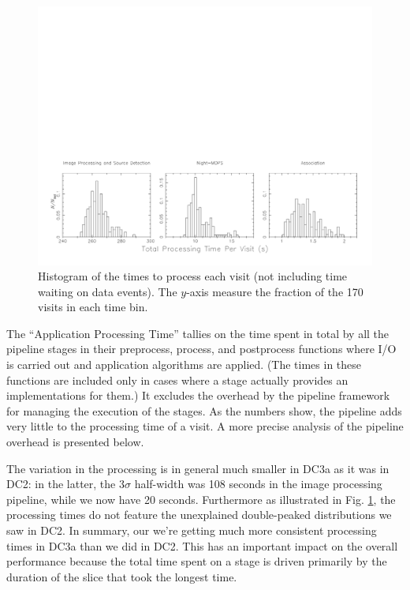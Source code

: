 \begin{figure}[hb]
\begin{center}
\includegraphics[width=\textwidth,bb=0 0 800 276,viewport=25 25 775 250,clip]{images/visitdist.pdf}
\caption{Histogram of the times to process each visit (not including
  time waiting on data events).  The $y$-axis measure the fraction of
  the 170 visits in each time bin.  
\label{fig:visitdist}}
\end{center}
\end{figure}


The ``Application Processing Time'' tallies on the time spent in total
by all the pipeline stages in their preprocess, process, and
postprocess functions where I/O is carried out and application
algorithms are applied.  (The times in these functions are included
only in cases where a stage actually provides an implementations for
them.)  It excludes the overhead by the pipeline framework for
managing the execution of the stages.  As the numbers show, the
pipeline adds very little to the processing time of a visit.  A more
precise analysis of the pipeline overhead is presented below.  

The variation in the processing is in general much smaller in DC3a as
it was in DC2: in the latter, the $3\sigma$ half-width was 108
seconds in the image processing pipeline, while we now have 20
seconds.  Furthermore as illustrated in Fig. \ref{fig:visitdist}, the
processing times do not feature the unexplained double-peaked
distributions we saw in DC2.  In summary, our we're getting much more
consistent processing times in DC3a than we did in DC2.  This has an
important impact on the overall performance because the total time
spent on a stage is driven primarily by the duration of the slice that
took the longest time.  

